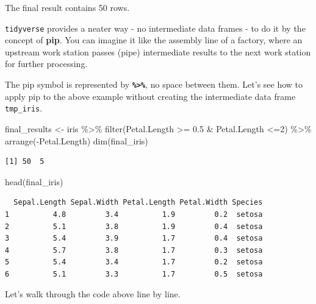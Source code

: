 \documentclass[
  letterpaper,
]{book}
\newenvironment{Shaded}{\begin{snugshade}}{\end{snugshade}}
\newcommand{\DecValTok}[1]{\textcolor[rgb]{0.68,0.00,0.00}{#1}}
\newcommand{\FloatTok}[1]{\textcolor[rgb]{0.68,0.00,0.00}{#1}}
\newcommand{\FunctionTok}[1]{\textcolor[rgb]{0.28,0.35,0.67}{#1}}
\newcommand{\NormalTok}[1]{\textcolor[rgb]{0.00,0.23,0.31}{#1}}
\newcommand{\OtherTok}[1]{\textcolor[rgb]{0.00,0.23,0.31}{#1}}
\newcommand{\SpecialCharTok}[1]{\textcolor[rgb]{0.37,0.37,0.37}{#1}}
\begin{document}
The final result contains 50 rows.

\texttt{tidyverse} provides a neater way - no intermediate data frames -
to do it by the concept of \textbf{pip}. You can imagine it like the
assembly line of a factory, where an upstream work station passes (pipe)
intermediate results to the next work station for further processing.

The pip symbol is represented by \textbf{\texttt{\%\textgreater{}\%}},
no space between them. Let's see how to apply pip to the above example
without creating the intermediate data frame \texttt{tmp\_iris}.

\begin{Shaded}
\begin{Highlighting}[]
\NormalTok{final\_results }\OtherTok{\textless{}{-}}\NormalTok{ iris }\SpecialCharTok{\%\textgreater{}\%} 
                   \FunctionTok{filter}\NormalTok{(Petal.Length }\SpecialCharTok{\textgreater{}=} \FloatTok{0.5} \SpecialCharTok{\&}\NormalTok{ Petal.Length }\SpecialCharTok{\textless{}=}\DecValTok{2}\NormalTok{) }\SpecialCharTok{\%\textgreater{}\%}
                   \FunctionTok{arrange}\NormalTok{(}\SpecialCharTok{{-}}\NormalTok{Petal.Length)}
\FunctionTok{dim}\NormalTok{(final\_iris)}
\end{Highlighting}
\end{Shaded}

\begin{verbatim}
[1] 50  5
\end{verbatim}

\begin{Shaded}
\begin{Highlighting}[]
\FunctionTok{head}\NormalTok{(final\_iris)}
\end{Highlighting}
\end{Shaded}

\begin{verbatim}
  Sepal.Length Sepal.Width Petal.Length Petal.Width Species
1          4.8         3.4          1.9         0.2  setosa
2          5.1         3.8          1.9         0.4  setosa
3          5.4         3.9          1.7         0.4  setosa
4          5.7         3.8          1.7         0.3  setosa
5          5.4         3.4          1.7         0.2  setosa
6          5.1         3.3          1.7         0.5  setosa
\end{verbatim}

Let's walk through the code above line by line.
\end{document}

